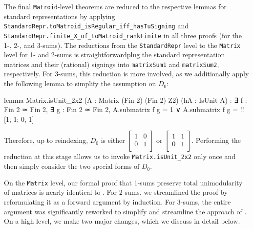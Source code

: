 The final \texttt{Matroid}-level theorems are reduced to the respective lemmas for standard representations by applying \texttt{StandardRepr.toMatroid\_isRegular\_iff\_hasTuSigning} and \texttt{StandardRepr.finite\_X\_of\_toMatroid\_rankFinite} in all three proofs (for the 1-, 2-, and 3-sums). The reductions from the \texttt{StandardRepr} level to the \texttt{Matrix} level for 1- and 2-sums is straightforward\EmDash plug the standard representation matrices and their (rational) signings into \texttt{matrixSum1} and \texttt{matrixSum2}, respectively. For 3-sums, this reduction is more involved, as we additionally apply the following lemma to simplify the assumption on $D_{0}$:
\begin{leancode}
lemma Matrix.isUnit_2x2
    (A : Matrix (Fin 2) (Fin 2) Z2)
    (hA : IsUnit A) :
  ∃ f : Fin 2 ≃ Fin 2,
  ∃ g : Fin 2 ≃ Fin 2,
    A.submatrix f g = 1 ∨
    A.submatrix f g = !![1, 1; 0, 1]
\end{leancode}
Therefore, up to reindexing, $D_{0}$ is either $\begin{bmatrix} 1 & 0 \\ 0 & 1 \\ \end{bmatrix}$ or $\begin{bmatrix} 1 & 1 \\ 0 & 1 \\ \end{bmatrix}$. Performing the reduction at this stage allows us to invoke \texttt{Matrix.isUnit\_2x2} only once and then simply consider the two special forms of $D_{0}$.

On the \texttt{Matrix} level, our formal proof that 1-sums preserve total unimodularity of matrices is nearly identical to \cite{Truemper2016}. For 2-sums, we streamlined the proof by reformulating it as a forward argument by induction. For 3-sums, the entire argument was significantly reworked to simplify and streamline the approach of \cite{Truemper2016}. On a high level, we make two major changes, which we discuss in detail below.

